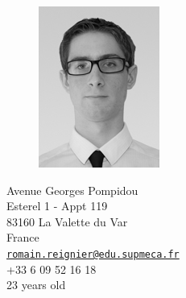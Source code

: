 \documentclass[a4paper,11pt,final]{memoir}
\begin{document}
\begin{figure}
	\hfill
	\includegraphics[width=0.5\columnwidth]{IMG_7936-Modifier_cv}
	\vspace{-0.5cm}
\end{figure}

\begin{flushright}\small
	Avenue Georges Pompidou\\
	Esterel 1 - Appt 119\\
	83160 La Valette du Var\\
	France\\
	{\footnotesize\href{mailto:romain.reignier@edu.supmeca.fr}{\nolinkurl{romain.reignier@edu.supmeca.fr}}}\\
	+33 6 09 52 16 18\\
	23 years old
\end{flushright}%
\end{document}
